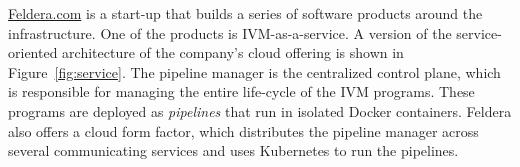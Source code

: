 \url{Feldera.com} is a start-up that builds a series of software
products around the \dbsp infrastructure.  One of the products is
IVM-as-a-service.  A version of the service-oriented architecture of
the company's cloud offering is shown in Figure~\ref{fig:service}.
The pipeline manager is the centralized control plane, which is
responsible for managing the entire life-cycle of the IVM programs.
These programs are deployed as \emph{pipelines} that run in isolated
Docker containers.  Feldera also offers a cloud form factor, which
distributes the pipeline manager across several communicating services
and uses Kubernetes to run the pipelines.

